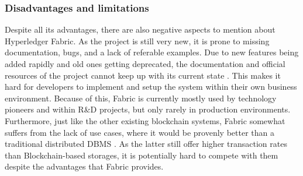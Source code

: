 \subsubsection{Disadvantages and limitations}
Despite all its advantages, there are also negative aspects to mention about Hyperledger Fabric. As the project is still very new, it is prone to missing documentation, bugs, and a lack of referable examples. Due to new features being added rapidly and old ones getting deprecated, the documentation and official resources of the project cannot keep up with its current state \cite{Brock2018}. This makes it hard for developers to implement and setup the system within their own business environment. 
Because of this, Fabric is currently mostly used by technology pioneers and within R\&D projects, but only rarely in production environments. \\
Furthermore, just like the other existing blockchain systems, Fabric somewhat suffers from the lack of use cases,  where it would be provenly better than a traditional distributed DBMS \cite{Brock2018}. As the latter still offer higher transaction rates than Blockchain-based storages, it is potentially hard to compete with them despite the advantages that Fabric provides. 


